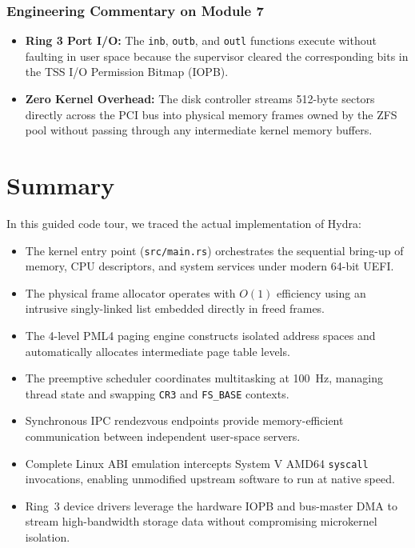 \subsubsection*{Engineering Commentary on Module 7}
\begin{itemize}
    \item \textbf{Ring 3 Port I/O:} The \texttt{inb}, \texttt{outb}, and \texttt{outl} functions execute without faulting in user space because the supervisor cleared the corresponding bits in the TSS I/O Permission Bitmap (IOPB).
    \item \textbf{Zero Kernel Overhead:} The disk controller streams 512-byte sectors directly across the PCI bus into physical memory frames owned by the ZFS pool without passing through any intermediate kernel memory buffers.
\end{itemize}

\section{Summary}
\label{sec:summary_chap9}

In this guided code tour, we traced the actual implementation of Hydra:
\begin{itemize}
    \item The kernel entry point (\texttt{src/main.rs}) orchestrates the sequential bring-up of memory, CPU descriptors, and system services under modern 64-bit UEFI.
    \item The physical frame allocator operates with $O(1)$ efficiency using an intrusive singly-linked list embedded directly in freed frames.
    \item The 4-level PML4 paging engine constructs isolated address spaces and automatically allocates intermediate page table levels.
    \item The preemptive scheduler coordinates multitasking at 100~Hz, managing thread state and swapping \texttt{CR3} and \texttt{FS\_BASE} contexts.
    \item Synchronous IPC rendezvous endpoints provide memory-efficient communication between independent user-space servers.
    \item Complete Linux ABI emulation intercepts System V AMD64 \texttt{syscall} invocations, enabling unmodified upstream software to run at native speed.
    \item Ring~3 device drivers leverage the hardware IOPB and bus-master DMA to stream high-bandwidth storage data without compromising microkernel isolation.
\end{itemize}

